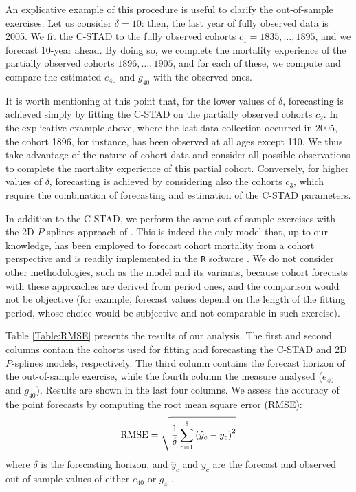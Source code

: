 \documentclass[11pt, a4paper]{article}
\begin{document}
An explicative example of this procedure is useful to clarify the out-of-sample exercises. Let us consider $\delta=10$: then, the last year of fully observed data is 2005. We fit the C-STAD to the fully observed cohorts $c_1=1835,\ldots,1895$, and we forecast 10-year ahead. By doing so, we complete the mortality experience of the partially observed cohorts $1896,\ldots,1905$, and for each of these, we compute and compare the estimated $e_{40}$ and $g_{40}$ with the observed ones. 

It is worth mentioning at this point that, for the lower values of $\delta$, forecasting is achieved simply by fitting the C-STAD on the partially observed cohorts $c_2$. In the explicative example above, where the last data collection occurred in 2005, the cohort 1896, for instance, has been observed at all ages except 110. We thus take advantage of the nature of cohort data and consider all possible observations to complete the mortality experience of this partial cohort.  Conversely, for higher values of $\delta$, forecasting is achieved by considering also the cohorts $c_3$, which require the combination of forecasting and estimation of the C-STAD parameters. 

In addition to the C-STAD, we perform the same out-of-sample exercises with the 2D $P$-splines approach of \cite{currie2004smoothing}. This is indeed the only model that, up to our knowledge, has been employed to forecast cohort mortality from a cohort perspective \citep{cmi2007stochastic} and is readily implemented in the \texttt{R} software \cite[in the \texttt{MortalitySmooth} package,][]{camarda2012mortalitysmooth}. We do not consider other methodologies, such as the \cite{lee1992modeling} model and its variants, because cohort forecasts with these approaches are derived from period ones, and the comparison would not be objective (for example, forecast values depend on the length of the fitting period, whose choice would be subjective and not comparable in such exercise).  

Table \ref{Table:RMSE} presents the results of our analysis. The first and second columns contain the cohorts used for fitting and forecasting the C-STAD and 2D $P$-splines models, respectively. The third column contains the forecast horizon of the out-of-sample exercise, while the fourth column the measure analysed ($e_{40}$ and $g_{40}$). Results are shown in the last four columns. We assess the accuracy of the point forecasts by computing the root mean square error (RMSE):
%
\begin{equation}\label{Eq:RMSE}
\mathrm{RMSE}=\sqrt{\frac{1}{\delta} \sum_{c=1}^{\delta} \left(\hat{y}_c-y_c\right)^2} \notag
\end{equation} 
%
where $\delta$ is the forecasting horizon, and $\hat{y}_c$ and $y_c$ are the forecast and observed out-of-sample values of either $e_{40}$ or $g_{40}$. 
\end{document}
